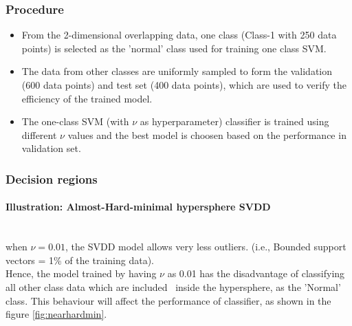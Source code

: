 \documentclass[fleqn]{article}
\newcommand{\myparagraph}[1]{\paragraph{#1}\mbox{}\\}
\begin{document}
\subsubsection{Procedure}
\begin{itemize}
  \item From the 2-dimensional overlapping data, one class (Class-1 with 250 data points) is selected as the 'normal' class used for training one class SVM.
  \item The data from other classes are uniformly sampled to form the validation (600 data points) and test set (400 data points), 
  which are used to verify the efficiency of the trained model.
  \item The one-class SVM (with $\nu$ as hyperparameter) classifier is trained using different $\nu$ values
   and the best model is choosen based on the performance in validation set. 
\end{itemize}

\subsubsection{Decision regions}
\myparagraph{Illustration: Almost-Hard-minimal hypersphere SVDD}

when $\nu = 0.01$, the SVDD model allows very less outliers. (i.e., Bounded support vectors = 1\% of the training data). \\
Hence, the model trained by having $\nu$ as 0.01 has the disadvantage of classifying all other class data which are included \
inside the hypersphere, as the 'Normal' class. This behaviour will affect the performance of classifier, as shown in the figure \ref{fig:nearhardmin}.
\end{document}
